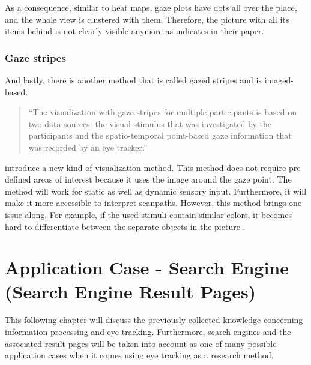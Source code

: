 As a consequence, similar to heat maps, gaze plots have dots all over the place, and the whole view is clustered with them. Therefore, the picture with all its items behind is not clearly visible anymore as \textcite[]{djamasbi2014eye} indicates in their paper.

\subsubsection{Gaze stripes}
And lastly, there is another method that is called gazed stripes and is imaged-based.

\begin{quote}
``The visualization with gaze stripes for multiple participants is based on two data sources: the visual stimulus that was investigated by the participants and the spatio-temporal point-based gaze information that was recorded by an eye tracker.''
\autocite[3]{kurzhals2016gaze}
\end{quote}

\textcite[]{kurzhals2016gaze} introduce a new kind of visualization method. This method does not require pre-defined areas of interest because it uses the image around the gaze point. The method will work for static as well as dynamic sensory input. Furthermore, it will make it more accessible to interpret scanpaths. 
However, this method brings one issue along. For example, if the used stimuli contain similar colors, it becomes hard to differentiate between the separate objects in the picture \autocite[]{kurzhals2016gaze}.

\section{Application Case - Search Engine (Search Engine Result Pages)}
\label{section:SearchEngine}
This following chapter will discuss the previously collected knowledge concerning information processing and eye tracking. Furthermore, search engines and the associated result pages will be taken into account as one of many possible application cases when it comes using eye tracking as a research method.

